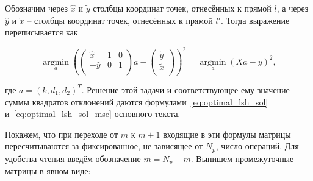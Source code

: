 Обозначим через $\widehat{x}$ и $\widetilde{y}$ столбцы координат точек, отнесённых к прямой $l$, а через $\widehat{y}$ и $\widetilde{x}$ -- столбцы координат точек, отнесённых к прямой $l'$. Тогда выражение переписывается как

\begin{equation}
	\operatorname*{argmin}_{a}\left(\begin{pmatrix}
		\widehat{x} & 1 & 0 \\
		-\widehat{y} & 0 & 1 \\
	\end{pmatrix}
	a - \begin{pmatrix}
		\widetilde{y} \\
		\widetilde{x} \\
	\end{pmatrix}\right)^2
	= \operatorname*{argmin}_{a}\left(Xa - y \right)^2,
	\label{eq:lshape_argmin_matrix}
\end{equation}

где $a = (k, d_1, d_2)^T$. Решение этой задачи и соответствующее ему значение суммы квадратов отклонений даются формулами~\cref{eq:optimal_lsh_sol} и~\cref{eq:optimal_lsh_sol_mse} основного текста.

Покажем, что при переходе от $m$ к $m+1$ входящие в эти формулы матрицы пересчитываются за фиксированное, не зависящее от $N_p$, число операций. Для удобства чтения введём обозначение $\overline{m} = N_p - m$. Выпишем промежуточные матрицы в явном виде:

